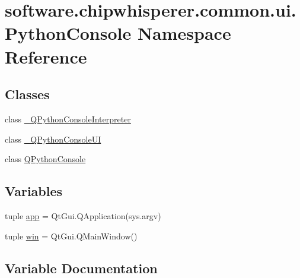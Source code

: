 \hypertarget{namespacesoftware_1_1chipwhisperer_1_1common_1_1ui_1_1PythonConsole}{}\section{software.\+chipwhisperer.\+common.\+ui.\+Python\+Console Namespace Reference}
\label{namespacesoftware_1_1chipwhisperer_1_1common_1_1ui_1_1PythonConsole}
\subsection*{Classes}
\begin{DoxyCompactItemize}
\item 
class \hyperlink{classsoftware_1_1chipwhisperer_1_1common_1_1ui_1_1PythonConsole_1_1__QPythonConsoleInterpreter}{\+\_\+\+Q\+Python\+Console\+Interpreter}
\item 
class \hyperlink{classsoftware_1_1chipwhisperer_1_1common_1_1ui_1_1PythonConsole_1_1__QPythonConsoleUI}{\+\_\+\+Q\+Python\+Console\+U\+I}
\item 
class \hyperlink{classsoftware_1_1chipwhisperer_1_1common_1_1ui_1_1PythonConsole_1_1QPythonConsole}{Q\+Python\+Console}
\end{DoxyCompactItemize}
\subsection*{Variables}
\begin{DoxyCompactItemize}
\item 
tuple \hyperlink{namespacesoftware_1_1chipwhisperer_1_1common_1_1ui_1_1PythonConsole_a84a2ea32d94c8b514b12cb2de7fe7f66}{app} = Qt\+Gui.\+Q\+Application(sys.\+argv)
\item 
tuple \hyperlink{namespacesoftware_1_1chipwhisperer_1_1common_1_1ui_1_1PythonConsole_a2d51c691a41358808762dc8a48207aa1}{win} = Qt\+Gui.\+Q\+Main\+Window()
\end{DoxyCompactItemize}


\subsection{Variable Documentation}
\hypertarget{namespacesoftware_1_1chipwhisperer_1_1common_1_1ui_1_1PythonConsole_a84a2ea32d94c8b514b12cb2de7fe7f66}{}
